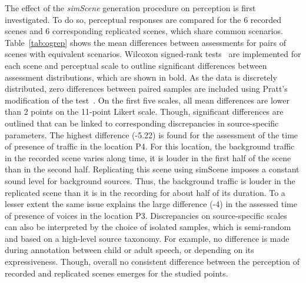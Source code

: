 \documentclass[twocolumn]{article}
\begin{document}
The effect of the \textit{simScene} generation procedure on perception is first investigated. To do so, perceptual responses are compared for the 6 recorded scenes and 6 corresponding replicated scenes, which share common scenarios. Table~\ref{tab:ogrep} shows the mean differences between assessments for pairs of scenes with equivalent scenarios. Wilcoxon signed-rank tests~\cite{wilcoxon1945} are implemented for each scene and perceptual scale to outline significant differences between assessment distributions, which are shown in bold. As the data is discretely distributed, zero differences between paired samples are included using Pratt's modification of the test~\cite{pratt1959}. On the first five scales, all mean differences are lower than 2 points on the 11-point Likert scale. Though, significant differences are outlined that can be linked to corresponding discrepancies in source-specific parameters. The highest difference (-5.22) is found for the assessment of the time of presence of traffic in the location P4. For this location, the background traffic in the recorded scene varies along time, it is louder in the first half of the scene than in the second half. Replicating this scene using simScene imposes a constant sound level for background sources. Thus, the background traffic is louder in the replicated scene than it is in the recording for about half of its duration. To a lesser extent the same issue explains the large difference (-4) in the assessed time of presence of voices in the location P3. Discrepancies on source-specific scales can also be interpreted by the choice of isolated samples, which is semi-random and based on a high-level source taxonomy. For example, no difference is made during annotation between child or adult speech, or depending on its expressiveness. Though, overall no consistent difference between the perception of recorded and replicated scenes emerges for the studied points.
\end{document}
